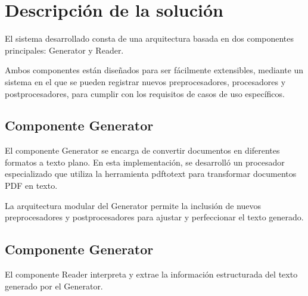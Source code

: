 \begin{comment}
    \end{itemize}








    \begin{itemize}

        \item
        Limitaciones
        y posibles mejoras: Menciona las limitaciones o restricciones que
        puedan haber afectado tus resultados. Esto puede incluir
        limitaciones en los datos, en los métodos utilizados o en la
        implementación del proyecto. También puedes sugerir posibles
        mejoras o áreas de investigación futuras basadas en las
        limitaciones identificadas.


    \end{itemize}

\end{comment}


\section{Descripción de la solución}
El sistema desarrollado consta de una arquitectura basada en dos componentes principales: Generator y Reader.

Ambos componentes están diseñados para ser fácilmente extensibles, mediante un sistema en el que se pueden registrar
nuevos preprocesadores, procesadores y postprocesadores, para cumplir con los requisitos de casos de uso específicos.

\subsection*{Componente Generator}
El componente Generator se encarga de convertir documentos en diferentes formatos a texto plano.
En esta implementación, se desarrolló un procesador especializado que utiliza la herramienta pdftotext para transformar
documentos PDF en texto.

La arquitectura modular del Generator permite la inclusión de nuevos preprocesadores y postprocesadores para ajustar y
perfeccionar el texto generado.

\subsection*{Componente Generator}
El componente Reader interpreta y extrae la información estructurada del texto generado por el Generator.

